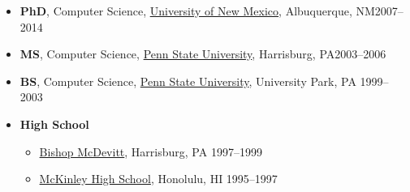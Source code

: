 \documentclass[11pt]{article}
\begin{document}
    \begin{itemize}


      \item \textbf{PhD}, Computer Science,  \href{https://www.unm.edu}{University of New Mexico}, Albuquerque, NM\hfill 2007--2014

      \item \textbf{MS}, Computer Science,  \href{https://www.hbg.psu.edu}{Penn State University}, Harrisburg, PA\hfill 2003--2006

      \item \textbf{BS}, Computer Science, \href{https://www.psu.edu}{Penn State University}, University Park, PA \hfill 1999--2003

      \item \textbf{High School}
            \begin{itemize}
              \item \href{https://www.bishopmcdevitt.org/mcd/}{Bishop McDevitt}, Harrisburg, PA \hfill 1997--1999
              \item \href{https://www.mckinley.k12.hi.us/}{McKinley High School}, Honolulu, HI \hfill 1995--1997
            \end{itemize}


    \end{itemize}
\end{document}
